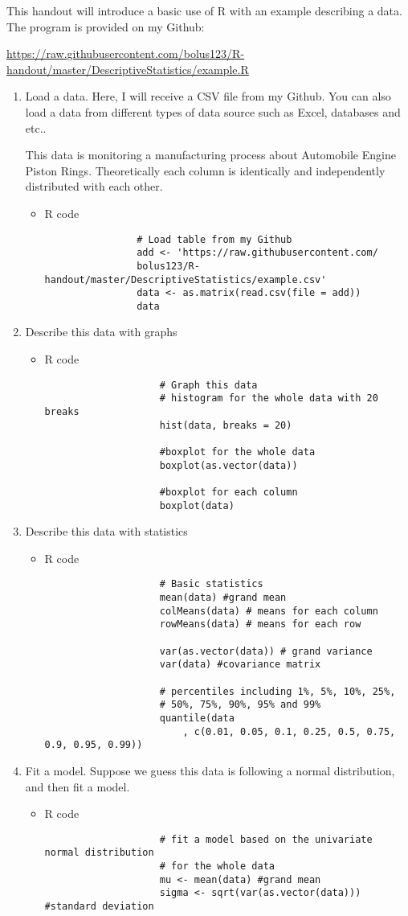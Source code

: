 This handout will introduce a basic use of R with an example describing a data. The program is provided on my Github: \par\href{url}{https://raw.githubusercontent.com/bolus123/R-handout/master/DescriptiveStatistics/example.R}
\begin{enumerate}
	\item Load a data. Here, I will receive a CSV file from my Github. You can also load a data from different types of data source such as Excel, databases and etc.. 
	\par This data is monitoring a manufacturing process about Automobile Engine Piston Rings. Theoretically each column is identically and independently distributed with each other.
		\begin{itemize}
			\item R code
				\begin{verbatim}
				# Load table from my Github
				add <- 'https://raw.githubusercontent.com/
				bolus123/R-handout/master/DescriptiveStatistics/example.csv'
				data <- as.matrix(read.csv(file = add))
				data
				\end{verbatim}
		\end{itemize}		
	\item Describe this data with graphs
		\begin{itemize}
			\item R code
				\begin{verbatim}
				 	# Graph this data
				 	# histogram for the whole data with 20 breaks
				 	hist(data, breaks = 20) 
				 	
				 	#boxplot for the whole data
				 	boxplot(as.vector(data)) 
				 	
				 	#boxplot for each column
				 	boxplot(data) 
				\end{verbatim}
		\end{itemize}
	\item Describe this data with statistics
		\begin{itemize}
			\item R code
				\begin{verbatim}
					# Basic statistics
					mean(data) #grand mean
					colMeans(data) # means for each column
					rowMeans(data) # means for each row
					
					var(as.vector(data)) # grand variance
					var(data) #covariance matrix
					
					# percentiles including 1%, 5%, 10%, 25%, 
					# 50%, 75%, 90%, 95% and 99%
					quantile(data 
						, c(0.01, 0.05, 0.1, 0.25, 0.5, 0.75, 0.9, 0.95, 0.99)) 
				\end{verbatim}
		\end{itemize}
	\item Fit a model. Suppose we guess this data is following a normal distribution, and then fit a model.
		\begin{itemize}
			\item R code
				\begin{verbatim}
					# fit a model based on the univariate normal distribution 
					# for the whole data
					mu <- mean(data) #grand mean
					sigma <- sqrt(var(as.vector(data))) #standard deviation
					

\end{verbatim}
\end{itemize}
\end{enumerate}
